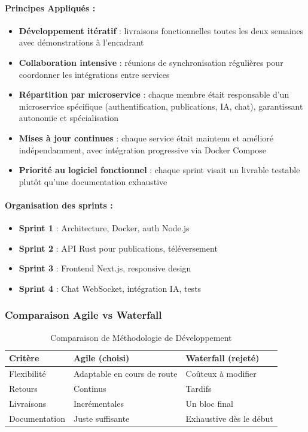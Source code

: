 \documentclass[12pt]{rapportPfe}
\begin{document}
\paragraph{Principes Appliqués :}
\begin{itemize}
    \item \textbf{Développement itératif} : livraisons fonctionnelles toutes les deux semaines avec démonstrations à l'encadrant
    \item \textbf{Collaboration intensive} : réunions de synchronisation régulières pour coordonner les intégrations entre services
    \item \textbf{Répartition par microservice} : chaque membre était responsable d’un microservice spécifique (authentification, publications, IA, chat), garantissant autonomie et spécialisation
    \item \textbf{Mises à jour continues} : chaque service était maintenu et amélioré indépendamment, avec intégration progressive via Docker Compose
    \item \textbf{Priorité au logiciel fonctionnel} : chaque sprint visait un livrable testable plutôt qu'une documentation exhaustive
\end{itemize}


\paragraph{Organisation des sprints :}
\begin{itemize}
    \item \textbf{Sprint 1} : Architecture, Docker, auth Node.js
    \item \textbf{Sprint 2} : API Rust pour publications, téléversement
    \item \textbf{Sprint 3} : Frontend Next.js, responsive design
    \item \textbf{Sprint 4} : Chat WebSocket, intégration IA, tests
\end{itemize}

\subsubsection{Comparaison Agile vs Waterfall}
\begin{table}[ht]
\centering
\begin{tabular}{|l|l|l|}
\hline
\textbf{Critère} & \textbf{Agile (choisi)} & \textbf{Waterfall (rejeté)} \\
\hline
Flexibilité & Adaptable en cours de route & Coûteux à modifier \\
\hline
Retours & Continus & Tardifs \\
\hline
Livraisons & Incrémentales & Un bloc final \\
\hline
Documentation & Juste suffisante & Exhaustive dès le début \\
\hline
\end{tabular}
\caption{Comparaison de Méthodologie de Développement}
\label{tab:compare-meth}
\end{table}
\end{document}
